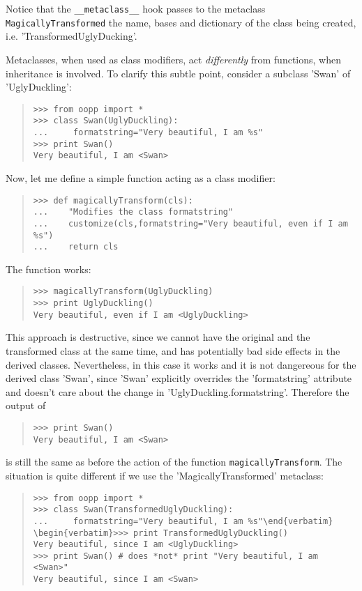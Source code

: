 \documentclass[10pt,english]{article}
\begin{document}
Notice that the \texttt{{\_}{\_}metaclass{\_}{\_}} hook passes to the metaclass 
\texttt{MagicallyTransformed} the name, bases and dictionary of the class 
being created, i.e. 'TransformedUglyDucking'.

Metaclasses, when used as class modifiers, act \emph{differently}
from functions, when inheritance is
involved. To clarify this subtle point, consider a subclass 'Swan' 
of 'UglyDuckling':
\begin{quote}
\begin{verbatim}>>> from oopp import *
>>> class Swan(UglyDuckling): 
...     formatstring="Very beautiful, I am %s"
>>> print Swan()
Very beautiful, I am <Swan>\end{verbatim}
\end{quote}

Now, let me define a simple function acting as a class modifier:
\begin{quote}
\begin{verbatim}>>> def magicallyTransform(cls): 
...    "Modifies the class formatstring"
...    customize(cls,formatstring="Very beautiful, even if I am %s")
...    return cls\end{verbatim}
\end{quote}

The function works:
\begin{quote}
\begin{verbatim}>>> magicallyTransform(UglyDuckling)
>>> print UglyDuckling()
Very beautiful, even if I am <UglyDuckling>\end{verbatim}
\end{quote}

This approach is destructive, since we cannot have the original 
and the transformed class at the same time, and has potentially bad side
effects in the derived classes. Nevertheless, in this case it works
and it is not dangereous for the derived class 'Swan', since 'Swan' 
explicitly overrides the 'formatstring' attribute and doesn't care about 
the change in 'UglyDuckling.formatstring'. Therefore the output
of
\begin{quote}
\begin{verbatim}>>> print Swan()
Very beautiful, I am <Swan>\end{verbatim}
\end{quote}

is still the same as before the action of the function \texttt{magicallyTransform}.
The situation is quite different if we use the 'MagicallyTransformed'
metaclass:
\begin{quote}
\begin{verbatim}>>> from oopp import *
>>> class Swan(TransformedUglyDuckling): 
...     formatstring="Very beautiful, I am %s"\end{verbatim}
\begin{verbatim}>>> print TransformedUglyDuckling() 
Very beautiful, since I am <UglyDuckling>
>>> print Swan() # does *not* print "Very beautiful, I am <Swan>"
Very beautiful, since I am <Swan> \end{verbatim}
\end{quote}
\end{document}
